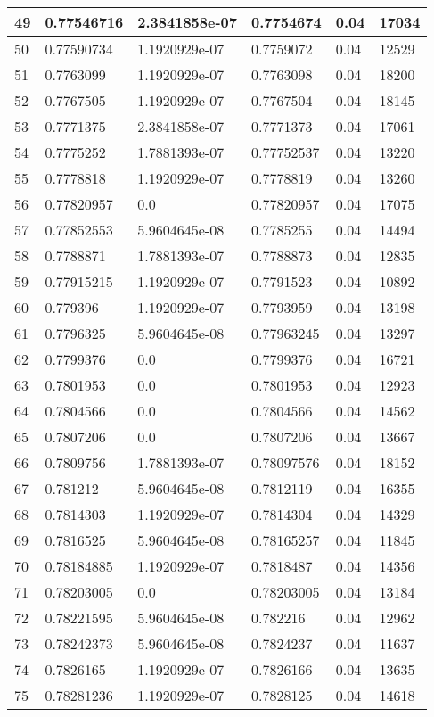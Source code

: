 \begin{longtable}{|l|l|l|l|l|l|}
49 & 0.77546716 & 2.3841858e-07 & 0.7754674 & 0.04 & 17034 \\ \hline 
50 & 0.77590734 & 1.1920929e-07 & 0.7759072 & 0.04 & 12529 \\ \hline 
51 & 0.7763099 & 1.1920929e-07 & 0.7763098 & 0.04 & 18200 \\ \hline 
52 & 0.7767505 & 1.1920929e-07 & 0.7767504 & 0.04 & 18145 \\ \hline 
53 & 0.7771375 & 2.3841858e-07 & 0.7771373 & 0.04 & 17061 \\ \hline 
54 & 0.7775252 & 1.7881393e-07 & 0.77752537 & 0.04 & 13220 \\ \hline 
55 & 0.7778818 & 1.1920929e-07 & 0.7778819 & 0.04 & 13260 \\ \hline 
56 & 0.77820957 & 0.0 & 0.77820957 & 0.04 & 17075 \\ \hline 
57 & 0.77852553 & 5.9604645e-08 & 0.7785255 & 0.04 & 14494 \\ \hline 
58 & 0.7788871 & 1.7881393e-07 & 0.7788873 & 0.04 & 12835 \\ \hline 
59 & 0.77915215 & 1.1920929e-07 & 0.7791523 & 0.04 & 10892 \\ \hline 
60 & 0.779396 & 1.1920929e-07 & 0.7793959 & 0.04 & 13198 \\ \hline 
61 & 0.7796325 & 5.9604645e-08 & 0.77963245 & 0.04 & 13297 \\ \hline 
62 & 0.7799376 & 0.0 & 0.7799376 & 0.04 & 16721 \\ \hline 
63 & 0.7801953 & 0.0 & 0.7801953 & 0.04 & 12923 \\ \hline 
64 & 0.7804566 & 0.0 & 0.7804566 & 0.04 & 14562 \\ \hline 
65 & 0.7807206 & 0.0 & 0.7807206 & 0.04 & 13667 \\ \hline 
66 & 0.7809756 & 1.7881393e-07 & 0.78097576 & 0.04 & 18152 \\ \hline 
67 & 0.781212 & 5.9604645e-08 & 0.7812119 & 0.04 & 16355 \\ \hline 
68 & 0.7814303 & 1.1920929e-07 & 0.7814304 & 0.04 & 14329 \\ \hline 
69 & 0.7816525 & 5.9604645e-08 & 0.78165257 & 0.04 & 11845 \\ \hline 
70 & 0.78184885 & 1.1920929e-07 & 0.7818487 & 0.04 & 14356 \\ \hline 
71 & 0.78203005 & 0.0 & 0.78203005 & 0.04 & 13184 \\ \hline 
72 & 0.78221595 & 5.9604645e-08 & 0.782216 & 0.04 & 12962 \\ \hline 
73 & 0.78242373 & 5.9604645e-08 & 0.7824237 & 0.04 & 11637 \\ \hline 
74 & 0.7826165 & 1.1920929e-07 & 0.7826166 & 0.04 & 13635 \\ \hline 
75 & 0.78281236 & 1.1920929e-07 & 0.7828125 & 0.04 & 14618 \\ \hline 
\end{longtable}